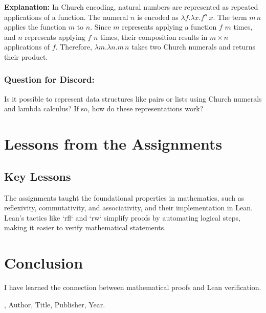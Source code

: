 \documentclass{article}
\theoremstyle{theorem}
\theoremstyle{definition}
\theoremstyle{remark}
\begin{document}
\textbf{Explanation:}
In Church encoding, natural numbers are represented as repeated applications of a function. The numeral $n$ is encoded as $\lambda f.\lambda x.f^n\,x$. The term $m\,n$ applies the function $m$ to $n$. Since $m$ represents applying a function $f$ $m$ times, and $n$ represents applying $f$ $n$ times, their composition results in $m \times n$ applications of $f$. Therefore, $\lambda m.\lambda n.m\,n$ takes two Church numerals and returns their product.

\subsubsection*{Question for Discord:}
Is it possible to represent data structures like pairs or lists using Church numerals and lambda calculus? If so, how do these representations work?


\section{Lessons from the Assignments}

\subsection{Key Lessons}

The assignments taught the foundational properties in mathematics, such as reflexivity, commutativity, and associativity, and their implementation in Lean. Lean's tactics like `rfl` and `rw` simplify proofs by automating logical steps, making it easier to verify mathematical statements. 

\section{Conclusion}\label{conclusion}

I have learned the connection between mathematical proofs and Lean verification. 

\begin{thebibliography}{99}
\bibitem[BLA], Author, Title, Publisher, Year.
\end{thebibliography}
\end{document}
